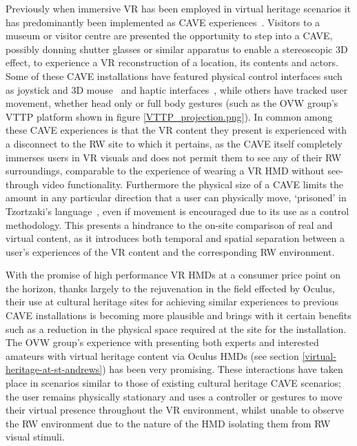 Previously when immersive VR has been employed in virtual heritage scenarios it has predominantly been implemented as CAVE experiences~\cite{Roussou2002}. Visitors to a museum or visitor centre are presented the opportunity to step into a CAVE, possibly donning shutter glasses or similar apparatus to enable a stereoscopic 3D effect, to experience a VR reconstruction of a location, its contents and actors. Some of these CAVE installations have featured physical control interfaces such as joystick and 3D mouse~\cite{cabral:x3dexperience} and haptic interfaces~\cite{Christou2006}, while others have tracked user movement, whether head only or full body  gestures (such as the OVW group's VTTP platform shown in figure \ref{VTTP_projection.png}). In common among these CAVE experiences is that the VR content they present is experienced with a disconnect to the RW site to which it pertains, as the CAVE itself completely immerses users in VR visuals and does not permit them to see any of their RW surroundings, comparable to the experience of wearing a VR HMD without see-through video functionality. Furthermore the physical size of a CAVE limits the amount in any particular direction that a user can physically move, `prisoned' in Tzortzaki's language~\cite{Tzortzaki2002}, even if movement is encouraged due to its use as a control methodology. This presents a hindrance to the on-site comparison of real and virtual content, as it introduces both temporal and spatial separation between a user's experiences of the VR content and the corresponding RW environment.

With the promise of high performance VR HMDs at a consumer price point on the horizon, thanks largely to the rejuvenation in the field effected by Oculus, their use at cultural heritage sites for achieving similar experiences to previous CAVE installations is becoming more plausible and brings with it certain benefits such as a reduction in the physical space required at the site for the installation. The OVW group's experience with presenting both experts and interested amateurs with virtual heritage content via Oculus HMDs (see section \ref{virtual-heritage-at-st-andrews}) has been very promising. These interactions have taken place in scenarios similar to those of existing cultural heritage CAVE scenarios; the user remains physically stationary and uses a controller or gestures to move their virtual presence throughout the VR environment, whilst unable to observe the RW environment due to the nature of the HMD isolating them from RW visual stimuli.

